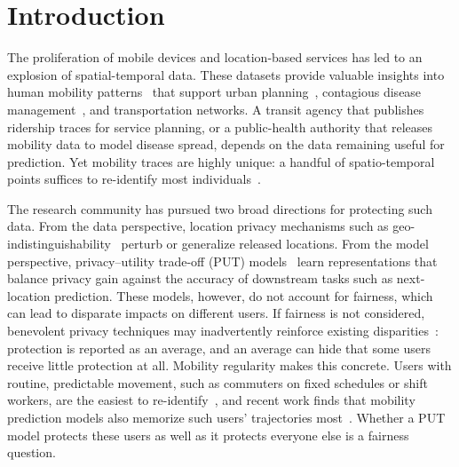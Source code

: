 \documentclass[sigconf,anonymous,review]{acmart}
\begin{document}

\maketitle

\section{Introduction}
The proliferation of mobile devices and location-based services has led to an explosion of spatial-temporal data. These datasets provide valuable insights into human mobility patterns~\cite{zheng2010geolife,luca2021survey,zhang2017deepst,ferreira2020communities} that support urban planning~\cite{zheng2014urban,jayarajah2018landuse}, contagious disease management~\cite{ghadiri2024recreational,eubank2004disease,wesolowski2012malaria}, and transportation networks. A transit agency that publishes ridership traces for service planning, or a public-health authority that releases mobility data to model disease spread, depends on the data remaining useful for prediction. Yet mobility traces are highly unique: a handful of spatio-temporal points suffices to re-identify most individuals~\cite{demontjoye2013unique,saleheen2016msieve}.

The research community has pursued two broad directions for protecting such data. From the data perspective, location privacy mechanisms such as geo-indistinguishability~\cite{andres2013geo} perturb or generalize released locations. From the model perspective, privacy--utility trade-off (PUT) models~\cite{rao2020trajgan,zhan2023mopae} learn representations that balance privacy gain against the accuracy of downstream tasks such as next-location prediction. These models, however, do not account for fairness, which can lead to disparate impacts on different users. If fairness is not considered, benevolent privacy techniques may inadvertently reinforce existing disparities~\cite{feldman2015disparate}: protection is reported as an average, and an average can hide that some users receive little protection at all. Mobility regularity makes this concrete. Users with routine, predictable movement, such as commuters on fixed schedules or shift workers, are the easiest to re-identify~\cite{song2010limits,demontjoye2013unique}, and recent work finds that mobility prediction models also memorize such users' trajectories most~\cite{kouam2026secrets}. Whether a PUT model protects these users as well as it protects everyone else is a fairness question.
\end{document}
